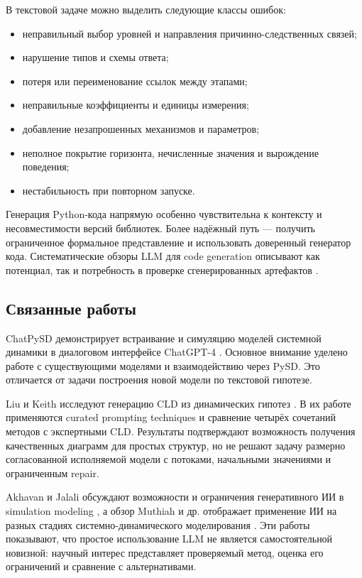 В текстовой задаче можно выделить следующие классы ошибок:

\begin{itemize}
    \item неправильный выбор уровней и направления причинно-следственных связей;
    \item нарушение типов и схемы ответа;
    \item потеря или переименование ссылок между этапами;
    \item неправильные коэффициенты и единицы измерения;
    \item добавление незапрошенных механизмов и параметров;
    \item неполное покрытие горизонта, нечисленные значения и вырождение поведения;
    \item нестабильность при повторном запуске.
\end{itemize}

Генерация Python-кода напрямую особенно чувствительна к контексту и несовместимости версий библиотек. Более надёжный путь --- получить ограниченное формальное представление и использовать доверенный генератор кода. Систематические обзоры LLM для code generation описывают как потенциал, так и потребность в проверке сгенерированных артефактов \cite{jiang2024survey}.

\subsection{Связанные работы}

ChatPySD демонстрирует встраивание и симуляцию моделей системной динамики в диалоговом интерфейсе ChatGPT-4 \cite{hu2025chatpysd}. Основное внимание уделено работе с существующими моделями и взаимодействию через PySD. Это отличается от задачи построения новой модели по текстовой гипотезе.

Liu и Keith исследуют генерацию CLD из динамических гипотез \cite{liu2025leveraging}. В их работе применяются curated prompting techniques и сравнение четырёх сочетаний методов с экспертными CLD. Результаты подтверждают возможность получения качественных диаграмм для простых структур, но не решают задачу размерно согласованной исполняемой модели с потоками, начальными значениями и ограниченным repair.

Akhavan и Jalali обсуждают возможности и ограничения генеративного ИИ в simulation modeling \cite{akhavan2024generative}, а обзор Muthiah и др. отображает применение ИИ на разных стадиях системно-динамического моделирования \cite{muthiah2025mapping}. Эти работы показывают, что простое использование LLM не является самостоятельной новизной: научный интерес представляет проверяемый метод, оценка его ограничений и сравнение с альтернативами.

